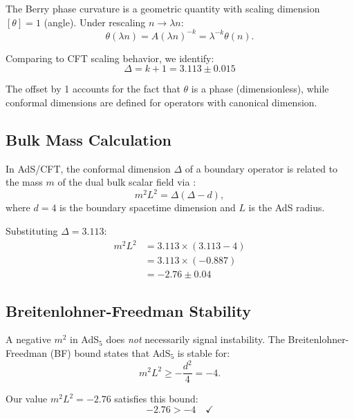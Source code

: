 \documentclass[aps,prd,twocolumn,superscriptaddress,floatfix]{revtex4-2}
\begin{document}
The Berry phase curvature is a geometric quantity with scaling dimension $[\theta] = 1$ (angle). Under rescaling $n \to \lambda n$:
\begin{equation}
\theta(\lambda n) = A (\lambda n)^{-k} = \lambda^{-k} \theta(n).
\end{equation}

Comparing to CFT scaling behavior, we identify:
\begin{equation}
\boxed{\Delta = k + 1 = 3.113 \pm 0.015}
\end{equation}

The offset by 1 accounts for the fact that $\theta$ is a phase (dimensionless), while conformal dimensions are defined for operators with canonical dimension.

\subsection{Bulk Mass Calculation}

In AdS/CFT, the conformal dimension $\Delta$ of a boundary operator is related to the mass $m$ of the dual bulk scalar field via \cite{klebanov2002}:
\begin{equation}
m^2 L^2 = \Delta(\Delta - d),
\label{eq:mass_dimension}
\end{equation}
where $d = 4$ is the boundary spacetime dimension and $L$ is the AdS radius.

Substituting $\Delta = 3.113$:
\begin{align}
m^2 L^2 &= 3.113 \times (3.113 - 4) \\
&= 3.113 \times (-0.887) \\
&= \boxed{-2.76 \pm 0.04}
\end{align}

\subsection{Breitenlohner-Freedman Stability}

A negative $m^2$ in AdS$_5$ does \textit{not} necessarily signal instability. The Breitenlohner-Freedman (BF) bound \cite{breitenlohner1982} states that AdS$_5$ is stable for:
\begin{equation}
m^2 L^2 \geq -\frac{d^2}{4} = -4.
\end{equation}

Our value $m^2 L^2 = -2.76$ satisfies this bound:
\begin{equation}
-2.76 > -4 \quad \checkmark
\end{equation}
\end{document}
